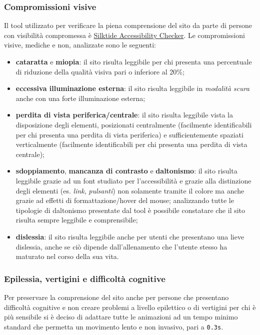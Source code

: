 \documentclass[a4paper,10pt]{article}
\begin{document}
	\subsubsection{Compromissioni visive}
	Il tool utilizzato per verificare la piena comprensione del sito da parte di persone con visibilità compromessa è \href{https://chromewebstore.google.com/detail/silktide-accessibility-ch/mpobacholfblmnpnfbiomjkecoojakah}{Silktide Accessibility Checker}. Le compromissioni visive, mediche e non, analizzate sono le seguenti:
	\begin{itemize}
		\item \textbf{cataratta} e \textbf{miopia}: il sito risulta leggibile per chi presenta una percentuale di riduzione della qualità visiva pari o inferiore al 20\%;
		\item \textbf{eccessiva illuminazione esterna}: il sito risulta leggibile in \textit{modalità scura} anche con una forte illuminazione esterna;
		\item \textbf{perdita di vista periferica/centrale}: il sito risulta leggibile vista la disposizione degli elementi, posizionati centralmente (facilmente identificabili per chi presenta una perdita di vista periferica) e sufficientemente spaziati verticalmente (facilmente identificabili per chi presenta una perdita di vista centrale);
		\item \textbf{sdoppiamento}, \textbf{mancanza di contrasto} e \textbf{daltonismo}: il sito risulta leggibile grazie ad un font studiato per l'accessibilità e grazie alla distinzione degli elementi (es. \textit{link}, \textit{pulsanti}) non solamente tramite il colore ma anche grazie ad effetti di formattazione/hover del mouse; analizzando tutte le tipologie di daltonismo presentate dal tool è possibile constatare che il sito risulta sempre leggibile e comprensibile;
		\item \textbf{dislessia}: il sito risulta leggibile anche per utenti che presentano una lieve dislessia, anche se ciò dipende dall'allenamento che l'utente stesso ha maturato nel corso della sua vita.
	\end{itemize}
	
	\subsubsection{Epilessia, vertigini e difficoltà cognitive}
	Per preservare la comprensione del sito anche per persone che presentano difficoltà cognitive e non creare problemi a livello epilettico o di vertigini per chi è più sensibile si è deciso di adattare tutte le animazioni ad un tempo minimo standard che permetta un movimento lento e non invasivo, pari a \texttt{0.3s}.
	
\end{document}
